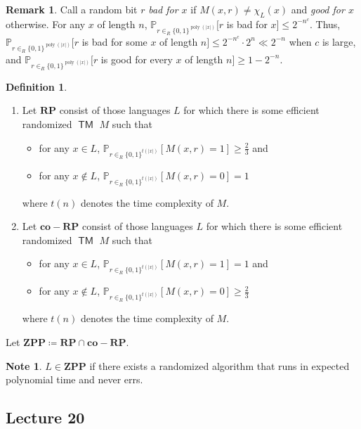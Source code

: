 \documentclass[10pt,letterpaper,cm]{nupset}
\theoremstyle{definition}
\newtheorem*{definition}{Definition}
\newtheorem{note}{Note}
\newtheorem{remark}{Remark}
\newcommand{\1}{\mathbf{1}}
\newcommand{\0}{\vec 0}
\DeclareMathOperator{\TM}{\mathsf{TM}}
\DeclareMathOperator{\poly}{poly}
\begin{document}
\begin{remark}
Call a random bit $r$ \textit{bad for $x$} if $M(x, r) \ne \chi_L(x)$ and \textit{good for $x$} otherwise. For any $x$ of length $n$, $\mathbb{P}_{r\in_R \{0,1\}^{\poly(\lvert{x}\rvert)}}[r$ is bad for $x] \leq 2^{{-}n^c}$. Thus, $\mathbb{P}_{r\in_R \{0,1\}^{\poly(\lvert{x}\rvert)}}[r$ is bad for some $x$ of length $n] \leq 2^{{-}n^c}\cdot 2^n \ll 2^{{-}n}$ when $c$ is large, and $\mathbb{P}_{r\in_R \{0,1\}^{\poly(\lvert{x}\rvert)}}[r$ is good for every $x$ of length $n] \geq 1 - 2^{{-}n}$. 
\end{remark}

\begin{definition} $ $
\begin{enumerate}
\item Let $\mathbf{RP}$ consist of those languages $L$ for which there is some efficient randomized $\TM$ $M$ such that 
\begin{itemize}
\item for any $x\in L$, $\mathbb{P}_{r\in_R \{0,1\}^{t(\lvert{x}\rvert)}}[M(x,r)=1] \geq \frac{2}{3}$ and
\item for any $x\notin L$, $\mathbb{P}_{r\in_R \{0,1\}^{t(\lvert{x}\rvert)}}[M(x,r)=0] = 1$
\end{itemize} where $t(n)$ denotes the time complexity of $M$.
\item Let $\mathbf{co{-}RP}$ consist of those languages $L$ for which there is some efficient randomized $\TM$ $M$ such that 
\begin{itemize}
\item for any $x\in L$, $\mathbb{P}_{r\in_R \{0,1\}^{t(\lvert{x}\rvert)}}[M(x,r)=1]= 1$ and
\item for any $x\notin L$, $\mathbb{P}_{r\in_R \{0,1\}^{t(\lvert{x}\rvert)}}[M(x,r)=0] \geq \frac{2}{3}$
\end{itemize} where $t(n)$ denotes the time complexity of $M$.
\end{enumerate}
Let $\mathbf{ZPP} \coloneqq \mathbf{RP} \cap \mathbf{co{-}RP}$.
\end{definition}

\begin{note}
$L \in \mathbf{ZPP}$ if there exists a randomized algorithm that runs in expected polynomial time and never errs. 
\end{note}

\subsection{Lecture 20}
\end{document}
